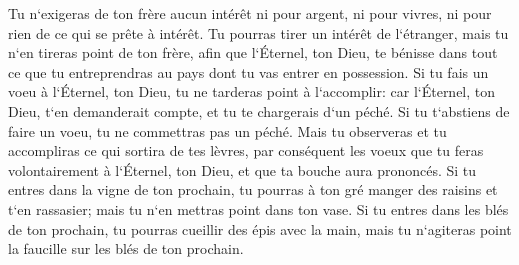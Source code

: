 \verse Tu n`exigeras de ton frère aucun intérêt ni pour argent, ni pour vivres, ni pour rien de ce qui se prête à intérêt. 
\verse Tu pourras tirer un intérêt de l`étranger, mais tu n`en tireras point de ton frère, afin que l`Éternel, ton Dieu, te bénisse dans tout ce que tu entreprendras au pays dont tu vas entrer en possession. 
\verse Si tu fais un voeu à l`Éternel, ton Dieu, tu ne tarderas point à l`accomplir: car l`Éternel, ton Dieu, t`en demanderait compte, et tu te chargerais d`un péché. 
\verse Si tu t`abstiens de faire un voeu, tu ne commettras pas un péché. 
\verse Mais tu observeras et tu accompliras ce qui sortira de tes lèvres, par conséquent les voeux que tu feras volontairement à l`Éternel, ton Dieu, et que ta bouche aura prononcés. 
\verse Si tu entres dans la vigne de ton prochain, tu pourras à ton gré manger des raisins et t`en rassasier; mais tu n`en mettras point dans ton vase. 
\verse Si tu entres dans les blés de ton prochain, tu pourras cueillir des épis avec la main, mais tu n`agiteras point la faucille sur les blés de ton prochain. 

\chapter{}

